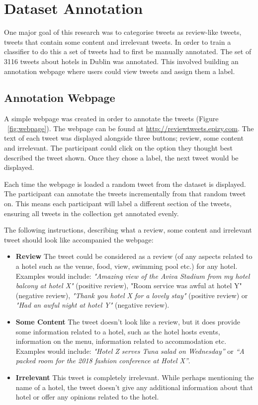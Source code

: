 \section{Dataset Annotation}

One major goal of this research was to categorise tweets as review-like tweets, tweets that contain some content and irrelevant tweets. In order to train a classifier to do this a set of tweets had to first be manually annotated. The set of 3116 tweets about hotels in Dublin was annotated. This involved building an annotation webpage where users could view tweets and assign them a label.

\subsection*{Annotation Webpage}

A simple webpage was created in order to annotate the tweets (Figure ~\ref{fig:webpage}). The webpage can be found at \url{http://reviewtweets.epizy.com}. The text of each tweet was displayed alongside three buttons; review, some content and irrelevant. The participant could click on the option they thought best described the tweet shown. Once they chose a label, the next tweet would be displayed. 

Each time the webpage is loaded a random tweet from the dataset is displayed. The participant can annotate the tweets incrementally from that random tweet on. This means each participant will label a different section of the tweets, ensuring all tweets in the collection get annotated evenly.

The following instructions, describing what a review, some content and irrelevant tweet should look like accompanied the webpage:
\begin{itemize}
    \item \textbf{Review} \newline
    The tweet could be considered as a review (of any aspects related to a hotel such as the venue, food, view, swimming pool etc.) for any hotel. Examples would include: \emph{"Amazing view of the Aviva Stadium from my hotel balcony at hotel X"} (positive review), "Room service was awful at hotel Y" (negative review), \emph{"Thank you hotel X for a lovely stay"} (positive review) or \emph{"Had an awful night at hotel Y"} (negative review).
    \item \textbf{Some Content} \newline
    The tweet doesn't look like a review, but it does provide some information related to a hotel, such as the hotel hosts events, information on the menu, information related to accommodation etc. Examples would include: \emph{"Hotel Z serves Tuna salad on Wednesday”} or \emph{“A packed room for the 2018 fashion conference at Hotel X”}.
    \item \textbf{Irrelevant} \newline
    This tweet is completely irrelevant. While perhaps mentioning the name of a hotel, the tweet doesn't give any additional information about that hotel or offer any opinions related to the hotel.
\end{itemize}

